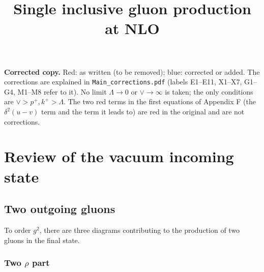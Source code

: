 \documentclass[aps,prd,amsmath,amssymb,nofootinbib]{revtex4-2}
\title{Single inclusive gluon production at NLO}
\numberwithin{equation}{section}
\begin{document}
\tableofcontents
{\color{blue}\noindent\textbf{Corrected copy.} Red: as written (to be removed); blue: corrected or added.
The corrections are explained in \texttt{Main\_corrections.pdf} (labels E1--E11, X1--X7, G1--G4, M1--M8 refer to it).
No limit $\Lambda\to0$ or $\vee\to\infty$ is taken; the only conditions are $\vee>p^+,k^+>\Lambda$. The two red terms in the first equations of Appendix F (the $\delta^2(u-v)$ term and the term it leads to) are red in the original and are not corrections.}


\section{Review of the vacuum incoming state}\label{sec:vac}
\subsection{Two outgoing gluons}
To order $g^2$, there are three  diagrams contributing to the production of two gluons in the final state.

\subsubsection{Two $\rho$ part}
\end{document}
